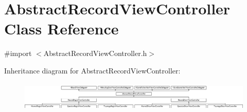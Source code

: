 \hypertarget{interface_abstract_record_view_controller}{
\section{AbstractRecordViewController Class Reference}
\label{interface_abstract_record_view_controller}
}


{\ttfamily \#import $<$AbstractRecordViewController.h$>$}

Inheritance diagram for AbstractRecordViewController:\begin{figure}[H]
\begin{center}
\leavevmode
\includegraphics[height=1.419518cm]{interface_abstract_record_view_controller}
\end{center}
\end{figure}
